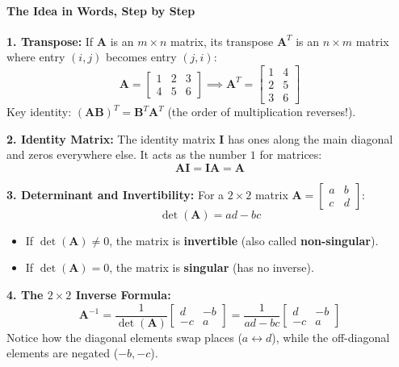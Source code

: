 \paragraph{The Idea in Words, Step by Step}
\textbf{1. Transpose:}
If $\mathbf{A}$ is an $m \times n$ matrix, its transpose $\mathbf{A}^T$ is an $n \times m$ matrix where entry $(i, j)$ becomes entry $(j, i)$:
\begin{equation}
\mathbf{A} = \begin{bmatrix} 1 & 2 & 3 \\ 4 & 5 & 6 \end{bmatrix} \implies
\mathbf{A}^T = \begin{bmatrix} 1 & 4 \\ 2 & 5 \\ 3 & 6 \end{bmatrix}
\end{equation}
Key identity: $(\mathbf{A}\mathbf{B})^T = \mathbf{B}^T \mathbf{A}^T$ (the order of multiplication reverses!).

\textbf{2. Identity Matrix:}
The identity matrix $\mathbf{I}$ has ones along the main diagonal and zeros everywhere else. It acts as the number $1$ for matrices:
\begin{equation}
\mathbf{A}\mathbf{I} = \mathbf{I}\mathbf{A} = \mathbf{A}
\end{equation}

\textbf{3. Determinant and Invertibility:}
For a $2 \times 2$ matrix $\mathbf{A} = \begin{bmatrix} a & b \\ c & d \end{bmatrix}$:
\begin{equation}
\det(\mathbf{A}) = ad - bc\label{eq:det_2x2}
\end{equation}
\begin{itemize}
    \item If $\det(\mathbf{A}) \ne 0$, the matrix is \textbf{invertible} (also called \textbf{non-singular}).
    \item If $\det(\mathbf{A}) = 0$, the matrix is \textbf{singular} (has no inverse).
\end{itemize}

\textbf{4. The $2 \times 2$ Inverse Formula:}
\begin{equation}
\mathbf{A}^{-1} = \frac{1}{\det(\mathbf{A})} \begin{bmatrix} d & -b \\ -c & a \end{bmatrix} = \frac{1}{ad - bc} \begin{bmatrix} d & -b \\ -c & a \end{bmatrix}\label{eq:inv_2x2}
\end{equation}
Notice how the diagonal elements swap places ($a \leftrightarrow d$), while the off-diagonal elements are negated ($-b, -c$).

